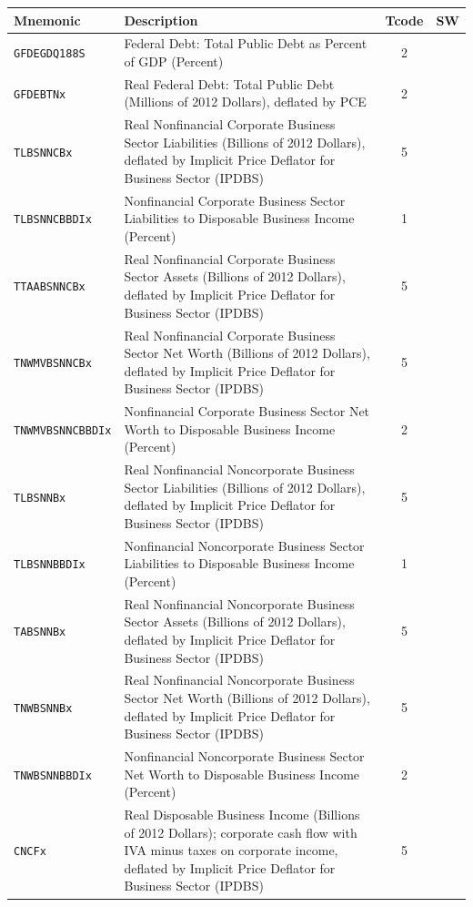 \documentclass[11pt]{article}
\begin{document}
\begin{landscape}
\begin{longtable}{L{4.5cm} L{14.5cm} c c}
\toprule
\textbf{Mnemonic} & \textbf{Description} & \textbf{Tcode} & \textbf{SW} \\
\midrule
\endhead
\texttt{GFDEGDQ188S} & Federal Debt: Total Public Debt as Percent of GDP (Percent) & 2 &  \\
\texttt{GFDEBTNx} & Real Federal Debt: Total Public Debt (Millions of 2012 Dollars), deflated by PCE & 2 &  \\
\texttt{TLBSNNCBx} & Real Nonfinancial Corporate Business Sector Liabilities (Billions of 2012 Dollars), deflated by Implicit Price Deflator for Business Sector (IPDBS) & 5 &  \\
\texttt{TLBSNNCBBDIx} & Nonfinancial Corporate Business Sector Liabilities to Disposable Business Income (Percent) & 1 &  \\
\texttt{TTAABSNNCBx} & Real Nonfinancial Corporate Business Sector Assets (Billions of 2012 Dollars), deflated by Implicit Price Deflator for Business Sector (IPDBS) & 5 &  \\
\texttt{TNWMVBSNNCBx} & Real Nonfinancial Corporate Business Sector Net Worth (Billions of 2012 Dollars), deflated by Implicit Price Deflator for Business Sector (IPDBS) & 5 &  \\
\texttt{TNWMVBSNNCBBDIx} & Nonfinancial Corporate Business Sector Net Worth to Disposable Business Income (Percent) & 2 &  \\
\texttt{TLBSNNBx} & Real Nonfinancial Noncorporate Business Sector Liabilities (Billions of 2012 Dollars), deflated by Implicit Price Deflator for Business Sector (IPDBS) & 5 &  \\
\texttt{TLBSNNBBDIx} & Nonfinancial Noncorporate Business Sector Liabilities to Disposable Business Income (Percent) & 1 &  \\
\texttt{TABSNNBx} & Real Nonfinancial Noncorporate Business Sector Assets (Billions of 2012 Dollars), deflated by Implicit Price Deflator for Business Sector (IPDBS) & 5 &  \\
\texttt{TNWBSNNBx} & Real Nonfinancial Noncorporate Business Sector Net Worth (Billions of 2012 Dollars), deflated by Implicit Price Deflator for Business Sector (IPDBS) & 5 &  \\
\texttt{TNWBSNNBBDIx} & Nonfinancial Noncorporate Business Sector Net Worth to Disposable Business Income (Percent) & 2 &  \\
\texttt{CNCFx} & Real Disposable Business Income (Billions of 2012 Dollars); corporate cash flow with IVA minus taxes on corporate income, deflated by Implicit Price Deflator for Business Sector (IPDBS) & 5 &  \\
\bottomrule
\end{longtable}


\end{landscape}
\end{document}
